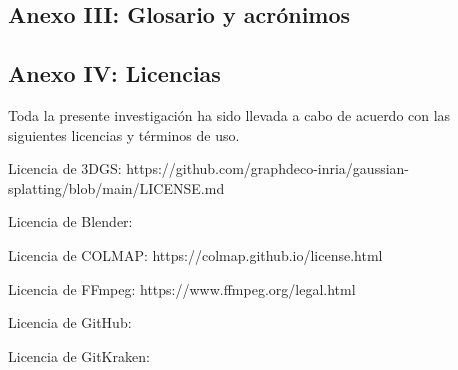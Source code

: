\documentclass[a4paper, 12pt, spanish, twoside]{article}
\begin{document}
\clearpage




\newpage
\subsection{Anexo III: Glosario y acrónimos} \label{sec:anexo3}

\glsaddall


\printglossary[title=Glosario, toctitle=Glosario]

\printglossary[type=\acronymtype, title=Acrónimos, toctitle=Acrónimos]


\clearpage




\newpage
\subsection{Anexo IV: Licencias} \label{sec:anexo4}

Toda la presente investigación ha sido llevada a cabo de acuerdo con las siguientes licencias y términos de uso.

Licencia de 3DGS: https://github.com/graphdeco-inria/gaussian-splatting/blob/main/LICENSE.md

Licencia de Blender: 

Licencia de COLMAP: https://colmap.github.io/license.html

Licencia de FFmpeg: https://www.ffmpeg.org/legal.html

Licencia de GitHub: 

Licencia de GitKraken: 
\end{document}
